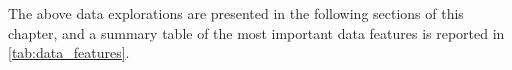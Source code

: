 The above data explorations are presented in the following sections of this chapter, and a summary table of the most important data features is reported in \cref{tab:data_features}.
\renewcommand{\cellalign}{cc}
\renewcommand{\theadalign}{cc}
\begin{table}[]
    \centering
    \resizebox{\textwidth}{!}{
    
}
\end{table}
